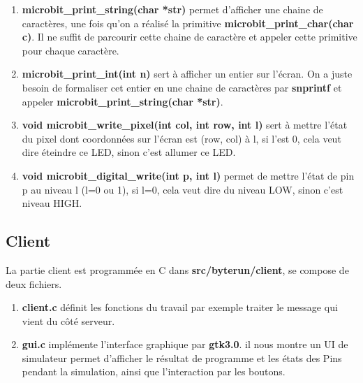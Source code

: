 \documentclass[14px]{article}
\begin{document}
\begin{enumerate}
		\item \textbf{microbit\_print\_string(char *str)} permet d'afficher une chaine de caractères, une fois qu'on a réalisé la primitive \textbf{microbit\_print\_char(char c)}. Il ne suffit de parcourir cette chaine de caractère et appeler cette primitive pour chaque caractère.
		\item \textbf{microbit\_print\_int(int n)} sert à afficher un entier sur l'écran. On a juste besoin de formaliser cet entier en une chaine de caractères par \textbf{snprintf} et appeler \textbf{microbit\_print\_string(char *str)}.
		\item \textbf{void microbit\_write\_pixel(int col, int row, int l)} sert à mettre l'état du pixel dont coordonnées sur l'écran est (row, col) à l, si l’est 0, cela veut dire éteindre ce LED, sinon c'est allumer ce LED.
		\item \textbf{void microbit\_digital\_write(int p, int l)} permet de mettre l'état de pin p au niveau l (l=0 ou 1), si l=0, cela veut dire du niveau LOW, sinon c'est niveau HIGH.
		
	\end{enumerate}
	
	
	
	\subsection{Client}
	La partie client est programmée en C dans \textbf{src/byterun/client}, se compose de deux fichiers.
	\begin{enumerate}
		\item \textbf{client.c} définit les fonctions du travail par exemple traiter le message qui vient du côté serveur.
		
		\item \textbf{gui.c} implémente l'interface graphique par \textbf{gtk3.0}.
		il nous montre un UI de simulateur permet d'afficher le résultat de programme et les états des Pins pendant la simulation, ainsi que l'interaction par les boutons.\\
	\end{enumerate}
	
\end{document}

